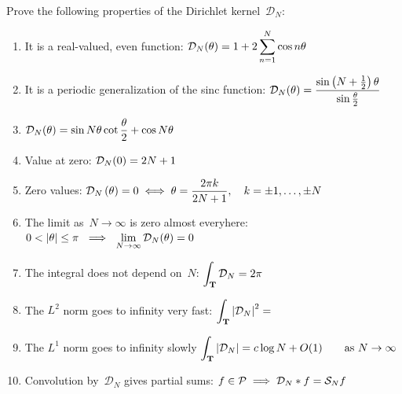\begin{exercice}
	Prove the following properties of the Dirichlet kernel~$\mathcal{D}_N$:
	\begin{enumerate}
		\item
			It is a real-valued, even function:
			$\displaystyle\mathcal{D}_N(\theta)=1+2\sum_{n=1}^{N}\cos n\theta$
		\item
			It is a periodic generalization of the sinc function:
			$\displaystyle\mathcal{D}_N(\theta)=\frac{\sin\left(N+\frac{1}{2}\right)\theta}{\sin\frac\theta2}$
		\item
			$\displaystyle\mathcal{D}_N(\theta)=\sin N\theta\cot\frac\theta2+\cos N\theta$
		\item
			Value at zero:
			$\displaystyle\mathcal{D}_N(0)=2N+1$
		\item
			Zero values:
			$\displaystyle\mathcal{D}_N\left(\theta\right)=0
			\iff
			\theta=\frac{2\pi k}{2N+1},
			\quad
			k=\pm 1,\ldots,\pm N$
		\item
			The limit as~$N\to\infty$ is zero almost everyhere:
			$\ds 0<|\theta|\le\pi\ \implies\
			\lim_{N\to\infty}\mathcal{D}_N(\theta)=0$
		\item
			The integral does not depend on~$N$:
			$\displaystyle\int_{\mathbf{T}}\mathcal{D}_N = 2\pi$
		\item
			The $L^2$ norm goes to infinity very fast:
			$\displaystyle\int_{\mathbf{T}}\left|\mathcal{D}_N\right|^2 =$
		\item
			The $L^1$ norm goes to infinity slowly
			$\displaystyle\int_{\mathbf{T}}\left|\mathcal{D}_N\right| =c\log N +
			O(1)\qquad\mathrm{as}\ N\to\infty$
		\item
			Convolution by~$\mathcal{D}_N$ gives partial sums:
			$\displaystyle f\in\mathcal{P}\implies \mathcal{D}_N*f = \mathcal{S}_N f$
	\end{enumerate}
\end{exercice}

